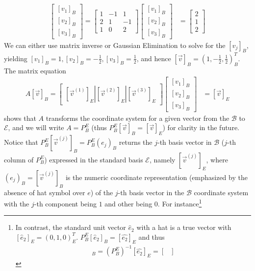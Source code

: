 \begin{solution}
\begin{align*}
\begin{bmatrix}
[v_1]_B \\
[v_2]_B \\
[v_3]_B
\end{bmatrix}
= 
\begin{bmatrix}
1 & -1 & 1 \\
2 & 1 & -1 \\
1 & 0 & 2
\end{bmatrix}
\begin{bmatrix}
[v_1]_B \\
[v_2]_B \\
[v_3]_B
\end{bmatrix}
&=
\begin{bmatrix}
2 \\
1 \\
2
\end{bmatrix}
\end{align*}
We can either use matrix inverse or Gaussian Elimination to solve for the $[v_j]_B$, yielding $[v_1]_B = 1, [v_2]_B = -\frac{1}{2}, [v_3]_B = \frac{1}{2}$, and hence $[\vec{v}]_B = (1, -\frac{1}{2}, \frac{1}{2})^T_B$. The matrix equation
\begin{align*}
A[\vec{v}]_B = \begin{bmatrix}[\vec{v}^{(1)}]_E|[\vec{v}^{(2)}]_E|[\vec{v}^{(3)}]_E
\end{bmatrix}\begin{bmatrix}
[v_1]_B \\
[v_2]_B \\
[v_3]_B
\end{bmatrix}
&= [\vec{v}]_E
\end{align*}
shows that $A$ transforms the coordinate system for a given vector from the $\mathcal{B}$ to $\mathcal{E}$, and we will write $A = P_B^E$ (thus $P_B^E [\vec{v}]_B = [\vec{v}]_E$) for clarity in the future. Notice that $P_B^E[\vec{v}^{(j)}]_B = P_B^E (e_j)_B$ returns the $j$-th basis vector in $\mathcal{B}$ ($j$-th column of $P_B^E$) expressed in the standard basis $\mathcal{E}$, namely $[\vec{v}^{(j)}]_E$, where $(e_j)_B = [\vec{v}^{(j)}]_B$ is the numeric coordinate representation (emphasized by the absence of hat symbol over $e$) of the $j$-th basis vector in the $\mathcal{B}$ coordinate system with the $j$-th component being $1$ and other being $0$. For instance\footnote{In contrast, the standard unit vector $\hat{e}_2$ with a hat is a true vector with $[\hat{e}_2]_E = (0,1,0)_E^T$. $P_B^E[\hat{e}_2]_B = [\hat{e_2}]_E$ and thus
\begin{align*}
[\hat{e}_2]_B =
(P_B^E)^{-1} [\hat{e_2}]_E =
\begin{bmatrix}

\end{bmatrix}
\end{align*}}
\end{solution}
